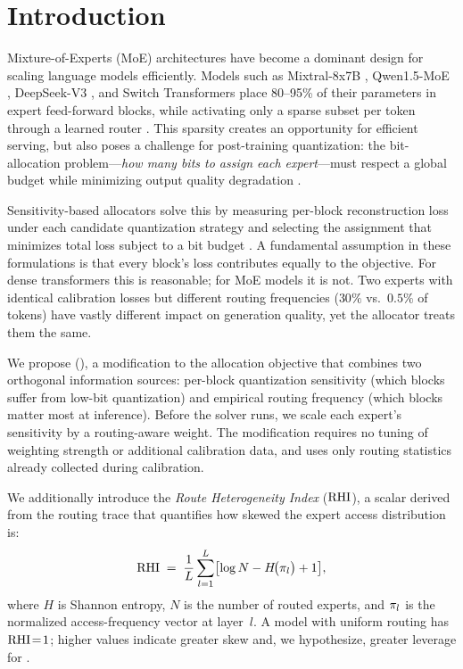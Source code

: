 \section{Introduction}
\label{sec:intro}

Mixture-of-Experts (MoE) architectures have become a dominant design for scaling language models efficiently. Models such as Mixtral-8x7B \citep{jiang2024mixtral}, Qwen1.5-MoE \citep{bai2023qwen}, DeepSeek-V3 \citep{deepseekai2024deepseekv3}, and Switch Transformers \citep{fedus2022switch} place 80--95\% of their parameters in expert feed-forward blocks, while activating only a sparse subset per token through a learned router \citep{shazeer2017outrageously,lepikhin2021gshard}. This sparsity creates an opportunity for efficient serving, but also poses a challenge for post-training quantization: the bit-allocation problem---\emph{how many bits to assign each expert}---must respect a global budget while minimizing output quality degradation \citep{duanmu2025mxmoe,li2024quantmoebench,frantar2023qmoe}.

Sensitivity-based allocators solve this by measuring per-block reconstruction loss under each candidate quantization strategy and selecting the assignment that minimizes total loss subject to a bit budget \citep{yao2021hawqv3,duanmu2025mxmoe}. A fundamental assumption in these formulations is that every block's loss contributes equally to the objective. For dense transformers this is reasonable; for MoE models it is not. Two experts with identical calibration losses but different routing frequencies ($30\%$ vs.\ $0.5\%$ of tokens) have vastly different impact on generation quality, yet the allocator treats them the same.

We propose \longmethod (\method), a modification to the allocation objective that combines two orthogonal information sources: per-block quantization sensitivity (which blocks suffer from low-bit quantization) and empirical routing frequency (which blocks matter most at inference). Before the solver runs, we scale each expert's sensitivity by a routing-aware weight. The modification requires no tuning of weighting strength or additional calibration data, and uses only routing statistics already collected during calibration.

We additionally introduce the \emph{Route Heterogeneity Index} ($\mathrm{RHI}$), a scalar derived from the routing trace that quantifies how skewed the expert access distribution is:
\begin{equation}
\label{eq:rhi_intro}
  \mathrm{RHI} \;=\; \frac{1}{L}\sum_{l=1}^{L}
    \bigl[\log N - H\!\bigl(\pi_l\bigr) + 1\bigr],
\end{equation}
where $H$ is Shannon entropy, $N$ is the number of routed experts, and $\pi_l$ is the normalized access-frequency vector at layer~$l$. A model with uniform routing has $\mathrm{RHI}\!=\!1$; higher values indicate greater skew and, we hypothesize, greater leverage for \method.


